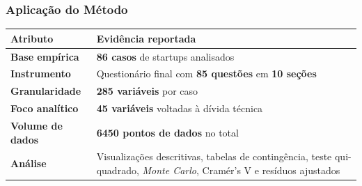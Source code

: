 \begin{frame}
\frametitle{Aplicação do Método}

\begin{table}
\small
\centering
\begin{tabularx}{\textwidth}{>{\bfseries}l X}
\toprule
Atributo & Evidência reportada \\
\midrule
Base empírica & \textbf{86 casos} de startups analisados \\
Instrumento & Questionário final com \textbf{85 questões} em \textbf{10 seções} \\
Granularidade & \textbf{285 variáveis} por caso \\
Foco analítico & \textbf{45 variáveis} voltadas à dívida técnica \\
Volume de dados & \textbf{6450 pontos de dados} no total \\
Análise & Visualizações descritivas, tabelas de contingência, teste qui-quadrado, \textit{Monte Carlo}, Cramér's V e resíduos ajustados \\
\bottomrule
\end{tabularx}
\end{table}

\end{frame}